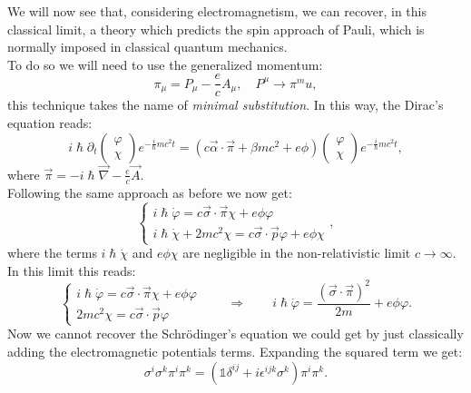 We will now see that, considering electromagnetism, we can recover, in this classical limit, a theory which predicts the spin approach of Pauli, which is normally imposed in classical quantum mechanics.\\To do so we will need to use the generalized momentum:
\begin{equation*}
    \pi_\mu=P_\mu-\frac{e}{c}A_\mu,\quad P^\mu\rightarrow\pi^mu,
\end{equation*}
this technique takes the name of \emph{minimal substitution}. In this way, the Dirac's equation reads:
\begin{equation*}
    i\hslash\partial_t\begin{pmatrix}
        \varphi\\\chi
    \end{pmatrix}e^{-\frac{i}{\hslash}mc^2t}=(c\vec\alpha\cdot\vec\pi+\beta mc^2+e\phi)\begin{pmatrix}
        \varphi\\\chi
    \end{pmatrix}e^{-\frac{i}{\hslash}mc^2t},
\end{equation*}
where $\vec\pi=-i\hslash\vec\nabla-\frac{e}{c}\vec A$.\\
Following the same approach as before we now get:
\begin{equation*}
    \begin{cases}
        i\hslash\dot\varphi=c\vec\sigma\cdot\vec\pi\chi+e\phi\varphi\\
        i\hslash\dot\chi+2mc^2\chi=c\vec\sigma\cdot\vec p\varphi+e\phi\chi
    \end{cases},
\end{equation*}
where the terms $i\hslash\dot\chi$ and $e\phi\chi$ are negligible in the non-relativistic limit $c\rightarrow \infty$. In this limit this reads:
\begin{equation*}
    \begin{cases}
        i\hslash\dot\varphi=c\vec\sigma\cdot\vec\pi\chi+e\phi\varphi\\
        2mc^2\chi=c\vec\sigma\cdot\vec p\varphi
    \end{cases}\qquad\Rightarrow\qquad i\hslash\dot\varphi=\frac{(\vec\sigma\cdot\vec\pi)^2}{2m}+e\phi\varphi.
\end{equation*}
Now we cannot recover the Schrödinger's equation we could get by just classically adding the electromagnetic potentials terms. Expanding the squared term we get:
\begin{equation*}
    \sigma^i\sigma^k\pi^i\pi^k=(\mathds{1}\delta^{ij}+i\epsilon^{ijk}\sigma^{k})\pi^i\pi^k.
\end{equation*}
